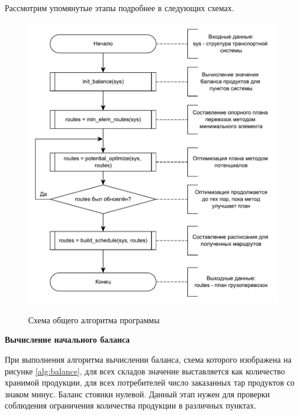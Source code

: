 Рассмотрим упомянутые этапы подробнее в следующих схемах.

\pagebreak
\begin{figure}[h]
	\begin{center}
		{\includegraphics[scale=0.7, angle=0, page=1]{img/algorithms/main.pdf}}
		\caption{Схема общего алгоритма программы}
		\label{alg:main}
	\end{center}
\end{figure}

\textbf{Вычисление начального баланса}

При выполнения алгоритма вычислении баланса, схема которого изображена на рисунке \ref{alg:balance}, для всех складов значение выставляется как количество хранимой продукции, для всех потребителей число заказанных тар продуктов со знаком минус. Баланс стоянки нулевой. Данный этап нужен для проверки соблюдения ограничения количества продукции в различных пунктах. 


